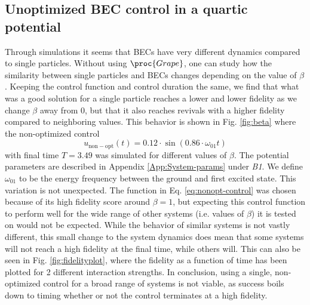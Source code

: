 \documentclass[a4paper, twocolumn]{revtex4-1}
\begin{document}
\subsection{Unoptimized BEC control in a quartic potential}
Through simulations it seems that BECs have very different dynamics compared to single particles. Without using $\proc{Grape}$, one can study how the similarity between single particles and BECs changes depending on the value of $\beta$. Keeping the control function and control duration the same, we find that what was a good solution for a single particle reaches a lower and lower fidelity as we change $\beta$ away from 0, but that it also reaches revivals with a higher fidelity compared to neighboring values. This behavior is shown in Fig. \ref{fig:beta} where the non-optimized control
\begin{equation}
	u_{\mathrm{non-opt}}(t)=0.12\cdot\sin(0.86\cdot \omega_{01} t)
	\label{eq:nonopt-control}
\end{equation} with final time $T=3.49$ was simulated for different values of $\beta$. The potential parameters are described in Appendix \ref{App:System-params} under \textit{B1}. We define $\omega_{01}$ to be the energy frequency between the ground and first excited state. This variation is not unexpected. The function in Eq. \eqref{eq:nonopt-control} was chosen because of its high fidelity score around $\beta=1$, but expecting this control function to perform well for the wide range of other systems (i.e. values of $\beta$) it is tested on would not be expected. While the behavior of similar systems is not vastly different, this small change to the system dynamics does mean that some systems will not reach a high fidelity at the final time, while others will. This can also be seen in Fig. \ref{fig:fidelityplot}, where the fidelity as a function of time has been plotted for 2 different interaction strengths. 
In conclusion, using a single, non-optimized control for a broad range of systems is not viable, as success boils down to timing whether or not the control terminates at a high fidelity.
\end{document}
